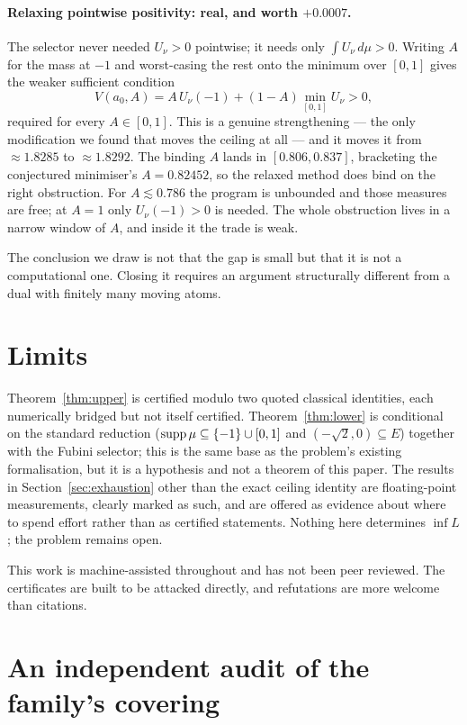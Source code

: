 \documentclass[11pt]{article}
\begin{document}
\paragraph{Relaxing pointwise positivity: real, and worth $+0.0007$.}
The selector never needed $U_\nu>0$ pointwise; it needs only $\int
U_\nu\,d\mu>0$. Writing $A$ for the mass at $-1$ and worst-casing the
rest onto the minimum over $[0,1]$ gives the weaker sufficient condition
\[
  V(a_0,A)=A\,U_\nu(-1)+(1-A)\min_{[0,1]}U_\nu>0 ,
\]
required for every $A\in[0,1]$. This is a genuine strengthening --- the
only modification we found that moves the ceiling at all --- and it
moves it from $\approx1.8285$ to $\approx1.8292$. The binding $A$ lands
in $[0.806,0.837]$, bracketing the conjectured minimiser's
$A=0.82452$, so the relaxed method does bind on the right obstruction.
For $A\lesssim0.786$ the program is unbounded and those measures are
free; at $A=1$ only $U_\nu(-1)>0$ is needed. The whole obstruction lives
in a narrow window of $A$, and inside it the trade is weak.

\medskip

The conclusion we draw is not that the gap is small but that it is not a
computational one. Closing it requires an argument structurally
different from a dual with finitely many moving atoms.

\section{Limits}

Theorem~\ref{thm:upper} is certified modulo two quoted classical
identities, each numerically bridged but not itself certified.
Theorem~\ref{thm:lower} is conditional on the standard reduction
($\operatorname{supp}\mu\subseteq\{-1\}\cup[0,1]$ and $(-\sqrt2,0)\subseteq E$)
together with the Fubini selector; this is the same base as the
problem's existing formalisation, but it is a hypothesis and not a
theorem of this paper. The results in
Section~\ref{sec:exhaustion} other than the exact ceiling identity are
floating-point measurements, clearly marked as such, and are offered as
evidence about where to spend effort rather than as certified
statements. Nothing here determines $\inf L$; the problem remains open.

This work is machine-assisted throughout and has not been peer reviewed.
The certificates are built to be attacked directly, and refutations are
more welcome than citations.


\section{An independent audit of the family's covering}\label{sec:family-covering}
\end{document}

